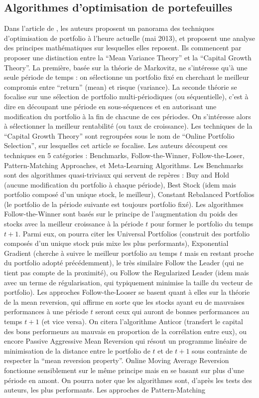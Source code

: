 \documentclass[a4paper]{article}
\begin{document}
\subsection{Algorithmes d'optimisation de portefeuilles}

Dans l'article de \textbf{\citet{Li2014} }, les auteurs proposent un panorama des techniques d'optimisation de portfolio à l'heure actuelle (mai 2013), et proposent une analyse des principes mathématiques sur lesquelles elles reposent. Ils commencent par proposer une distinction entre la ``Mean Variance Theory'' et la ``Capital Growth Theory''. La première, basée sur la théorie de Markovitz, ne s'intéresse qu'à une seule période de temps : on sélectionne un portfolio fixé en cherchant le meilleur compromis entre ``return'' (mean) et risque (variance). La seconde théorie se focalise sur une sélection de portfolio multi-périodiques (ou séquentielle), c'est à dire en découpant une période en sous-séquences et en autorisant une modification du portfolio à la fin de chacune de ces périodes. On s'intéresse alors à sélectionner la meilleur rentabilité (ou taux de croissance). Les techniques de la ``Capital Growth Theory'' sont regroupées sous le nom de ``Online Portfolio Selection'', sur lesquelles cet article se focalise. Les auteurs découpent ces techniques en 5 catégories : Benchmarks, Follow-the-Winner, Follow-the-Loser, Pattern-Matching Approaches, et Meta-Learning Algorithms. Les Benchmarks sont des algorithmes quasi-triviaux qui servent de repères : Buy and Hold (aucune modification du portfolio à chaque période), Best Stock (idem mais portfolio composé d'un unique stock, le meilleur), Constant Rebalanced Portfolios (le portfolio de la période suivante est toujours portfolio fixé). Les algorithmes Follow-the-Winner sont basés sur le principe de l'augmentation du poids des stocks avec la meilleur croissance à la période $t$ pour former le portfolio du temps $t+1$. Parmi eux, on pourra citer les Universal Portfolios (construit des portfolio composés d'un unique stock puis mixe les plus performants), Exponential Gradient (cherche à suivre le meilleur portfolio au temps $t$ mais en restant proche du portfolio adopté précédemment), le très similaire Follow the Leader (qui ne tient pas compte de la proximité), ou Follow the Regularized Leader (idem mais avec un terme de régularisation, qui typiquement minimise la taille du vecteur de portfolio). Les approches Follow-the-Looser se basent quant à elles sur la théorie de la mean reversion, qui affirme en sorte que les stocks ayant eu de mauvaises performances à une période $t$ seront ceux qui auront de bonnes performances au temps $t+1$ (et vice versa). On citera l'algorithme Anticor (transfert le capital des bons performeurs au mauvais en proportion de la corrélation entre eux), ou encore Passive Aggressive Mean Reversion qui résout un programme linéaire de minimisation de la distance entre le portfolio de $t$ et de $t+1$ sous contrainte de respecter la ``mean reversion property''. Online Moving Average Reversion fonctionne sensiblement sur le même principe mais en se basant sur plus d'une période en amont. On pourra noter que les algorithmes sont, d'après les tests des auteurs, les plus performants. Les approches de Pattern-Matching 
\end{document}
